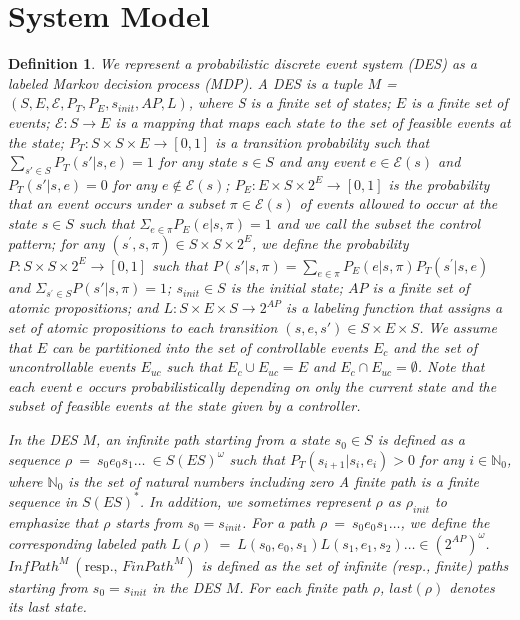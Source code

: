 \documentclass[letterpaper, 10 pt, conference, dvipdfmx]{ieeeconf}
\newtheorem{definition}{Definition}
\begin{document}
\section{System Model}

\begin{definition}
We represent a probabilistic discrete event system (DES) as a labeled Markov decision process (MDP). A DES is a tuple $M$ = $(S, E, \mathcal{E}, P_T, P_E, s_{init}, AP, L)$, where S is a finite set of states; $E$ is a finite set of events; $\mathcal{E} : S \rightarrow E$ is a mapping that maps each state to the set of feasible events at the state; $P_T:S \times S \times E \rightarrow [0,1]$ is a transition probability such that $\sum_{s' \in S} P_T(s'|s,e) = 1$ for any state $s \in S$ and any event $e \in \mathcal{E}(s) $ and $P_T(s'|s,e) = 0$ for any $e \notin \mathcal{E}(s)$; $P_E : E \times S \times 2^E \rightarrow [0,1]$ is the probability that an event occurs under a subset $\pi \in \mathcal{E}(s)$ of events allowed to occur at the state $s \in S$ such that $\Sigma_{e \in \pi} P_E(e|s,\pi) = 1$ and we call the subset the control pattern; for any $(s^{\prime}, s, \pi) \in S \times S \times 2^E$, we define the probability $P : S \times S \times 2^{E} \rightarrow [0,1]$ such that $P(s'|s,\pi) = \sum_{e \in \pi}P_E(e|s,\pi) P_T(s^{\prime}|s,e)$ and $\Sigma_{s^{\prime} \in S} P(s'|s,\pi) = 1$; $s_{init} \in S$ is the initial state; $AP$ is a finite set of atomic propositions; and $L : S \times E \times S \rightarrow 2^{AP}$ is a labeling function that assigns a set of atomic propositions to each transition $(s, e, s') \in S \times E \times S$. We assume that $E$ can be partitioned into the set of controllable events $E_c$ and the set of uncontrollable events $E_{uc}$ such that $E_c \cup E_{uc} = E$ and $E_c \cap E_{uc} = \emptyset$. Note that each event $e$ occurs probabilistically depending on only the current state and the subset of feasible events at the state given by a controller.

In the DES $M$, an infinite path starting from a state $s_0 \in S$ is defined as a sequence $\rho\ =\ s_0e_0s_1 \ldots\ \in S (E S)^{\omega}$ such that $P_T(s_{i+1}|s_i, e_i) > 0$ for any $ i \in \mathbb{N}_0$, where $\mathbb{N}_0$ is the set of natural numbers including zero A finite path is a finite sequence in $S (E S)^*$. In addition, we sometimes represent $\rho$ as $\rho_{init}$ to emphasize that $\rho$ starts from $s_0 = s_{init}$.
For a path $\rho\ =\ s_0e_0s_1 \ldots$, we define the corresponding labeled path $L(\rho)\ =\ L(s_0,e_0,s_1)L(s_1,e_1,s_2) \ldots \in (2^{AP})^{\omega}$.
 $InfPath^{M}\ ( \text{resp., }FinPath^{M})$ is defined as the set of infinite (resp., finite) paths starting from $s_0=s_{init}$ in the DES $M$. For each finite path $\rho$, $last(\rho)$ denotes its last state.
\end{definition}
\end{document}
